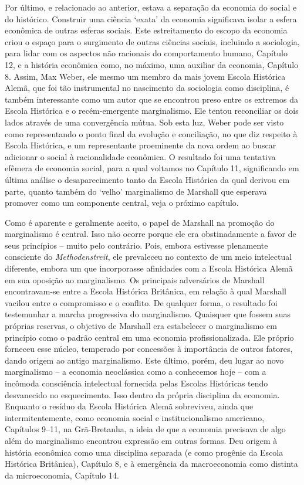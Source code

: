 \documentclass[12pt]{article}
\begin{document}
Por último, e relacionado ao anterior, estava a separação da economia do social e do histórico. Construir uma ciência ‘exata’ da economia significava isolar a esfera econômica de outras esferas sociais. Este estreitamento do escopo da economia criou o espaço para o surgimento de outras ciências sociais, incluindo a sociologia, para lidar com os aspectos não racionais do comportamento humano, Capítulo 12, e a história econômica como, no máximo, uma auxiliar da economia, Capítulo 8. Assim, Max Weber, ele mesmo um membro da mais jovem Escola Histórica Alemã, que foi tão instrumental no nascimento da sociologia como disciplina, é também interessante como um autor que se encontrou preso entre os extremos da Escola Histórica e o recém-emergente marginalismo. Ele tentou reconciliar os dois lados através de uma convergência mútua. Sob esta luz, Weber pode ser visto como representando o ponto final da evolução e conciliação, no que diz respeito à Escola Histórica, e um representante proeminente da nova ordem ao buscar adicionar o social à racionalidade econômica. O resultado foi uma tentativa efêmera de economia social, para a qual voltamos no Capítulo 11, significando em última análise o desaparecimento tanto da Escola Histórica da qual derivou em parte, quanto também do ‘velho’ marginalismo de Marshall que esperava promover como um componente central, veja o próximo capítulo.

Como é aparente e geralmente aceito, o papel de Marshall na promoção do marginalismo é central. Isso não ocorre porque ele era obstinadamente a favor de seus princípios – muito pelo contrário. Pois, embora estivesse plenamente consciente do \textit{Methodenstreit}, ele prevaleceu no contexto de um meio intelectual diferente, embora um que incorporasse afinidades com a Escola Histórica Alemã em sua oposição ao marginalismo. Os principais adversários de Marshall encontravam-se entre a Escola Histórica Britânica, em relação à qual Marshall vacilou entre o compromisso e o conflito. De qualquer forma, o resultado foi testemunhar a marcha progressiva do marginalismo. Quaisquer que fossem suas próprias reservas, o objetivo de Marshall era estabelecer o marginalismo em princípio como o padrão central em uma economia profissionalizada. Ele próprio forneceu esse núcleo, temperado por concessões à importância de outros fatores, dando origem ao antigo marginalismo. Este último, porém, deu lugar ao novo marginalismo – a economia neoclássica como a conhecemos hoje – com a incômoda consciência intelectual fornecida pelas Escolas Históricas tendo desvanecido no esquecimento. Isso dentro da própria disciplina da economia. Enquanto o resíduo da Escola Histórica Alemã sobreviveu, ainda que intermitentemente, como economia social e institucionalismo americano, Capítulos 9–11, na Grã-Bretanha, a ideia de que a economia precisava de algo além do marginalismo encontrou expressão em outras formas. Deu origem à história econômica como uma disciplina separada (e como progênie da Escola Histórica Britânica), Capítulo 8, e à emergência da macroeconomia como distinta da microeconomia, Capítulo 14.
\end{document}
